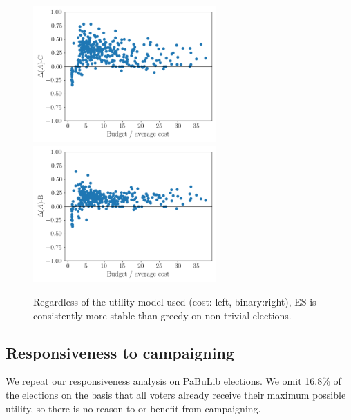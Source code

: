 \documentclass[mnsc,blindrev]{informs3_freeuse} %
\newcommand{\mes}{ES}
\newcommand{\pabu}{PaBuLib}
\begin{document}
\begin{figure}[!h]
\begin{center}
\includegraphics[width=7cm]{../experiment/greedy_ES_cost_0.01.png}
\includegraphics[width=7cm]{../experiment/density_greedy_ES_0.01.png}
\caption{Regardless of the utility model used (cost: left, binary:right), \mes{} is consistently more stable than greedy on non-trivial elections. 
}\label{fig:pabulib:entvsbudget}
\end{center}
\vspace{-3mm}
\end{figure}

\subsection{Responsiveness to campaigning} 
We repeat our responsiveness analysis on \pabu{} elections. We omit 16.8\% of the elections on the basis that all voters already receive their maximum possible utility, so there is no reason to or benefit from campaigning. 
\end{document}
